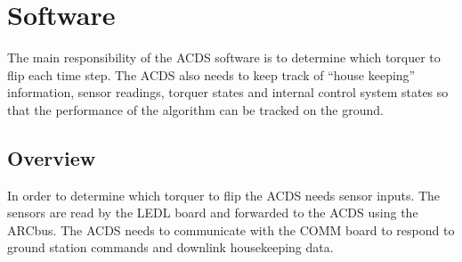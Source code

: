 
\chapter{Software}
\label{ch:Software}

The main responsibility of the \ac{ACDS} software is to determine which torquer to flip each time step. The \ac{ACDS} also needs to keep track of \enquote{house keeping} information, sensor readings, torquer states and internal control system states so that the performance of the algorithm can be tracked on the ground. 

\section{Overview}

In order to determine which torquer to flip the \ac{ACDS} needs sensor inputs. The sensors are read by the \ac{LEDL} board and forwarded to the \ac{ACDS} using the \ac{ARC}bus. The \ac{ACDS} needs to communicate with the \ac{COMM} board to respond to ground station commands and downlink housekeeping data.

